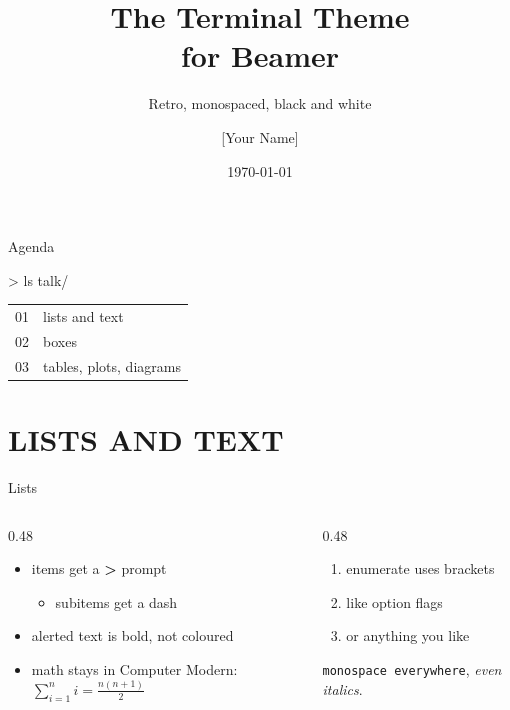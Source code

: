 \documentclass[aspectratio=169,10pt]{beamer}
\title[Terminal theme]{The Terminal Theme\\for Beamer}
\subtitle{Retro, monospaced, black and white}
\author{[Your Name]}
\institute{[Affiliation]}
\date{\today}
\begin{document}
\begin{frame}
  \titlepage
\end{frame}

\begin{frame}{Agenda}
\begin{tbox}{> ls talk/}
\small
\begin{tabular}{@{}l@{\quad}l@{}}
01 & lists and text \\
02 & boxes \\
03 & tables, plots, diagrams \\
\end{tabular}
\end{tbox}
\end{frame}

\section{LISTS AND TEXT}

\begin{frame}{Lists}
\begin{columns}[T]
\begin{column}{0.48\textwidth}
\begin{itemize}
\item items get a \textbf{>} prompt
  \begin{itemize}
  \item subitems get a dash
  \end{itemize}
\item \alert{alerted text} is bold, not coloured
\item math stays in Computer Modern: $\sum_{i=1}^{n} i = \tfrac{n(n+1)}{2}$
\end{itemize}
\end{column}
\begin{column}{0.48\textwidth}
\begin{enumerate}
\item enumerate uses brackets
\item like option flags
\item[\inv{!}] or anything you like
\end{enumerate}
\vskip8pt
\texttt{monospace everywhere}, \emph{even italics}.
\end{column}
\end{columns}
\end{frame}
\end{document}
